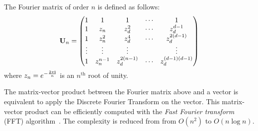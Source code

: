 \begin{definition}
  The Fourier matrix of order $n$ is defined as follows:
  \begin{equation}
    \mathbf{U}_n = 
    \begin{pmatrix}
      1      & 1           & 1              & \cdots & 1           \\
      1      & z_n       & z_d^2        & \cdots & z_d^{d-1} \\
      1      & z_n^2     & z_d^4        & \cdots & z_d^{2(d-1)} \\
      \vdots & \vdots      & \vdots         &        & \vdots      \\
      1      & z_n^{n-1} & z_d^{2(n-1)} & \cdots & z_d^{(d-1)(d-1)}
    \end{pmatrix}
  \end{equation}
  where $z_n = e^{-\frac{2\pi\mathbf{i}}{n}}$ is an $n^{\text{th}}$ root of unity.
  \label{definition:ch2-fourier_matrix}
\end{definition}
\noindent
The matrix-vector product between the Fourier matrix above and a vector is equivalent to apply the Discrete Fourier Transform on the vector.
This matrix-vector product can be efficiently computed with the \emph{Fast Fourier transform} (FFT) algorithm~\cite{cooley1965algorithm}.
The complexity is reduced from from $O(n^2)$ to $O(n \log n)$.

